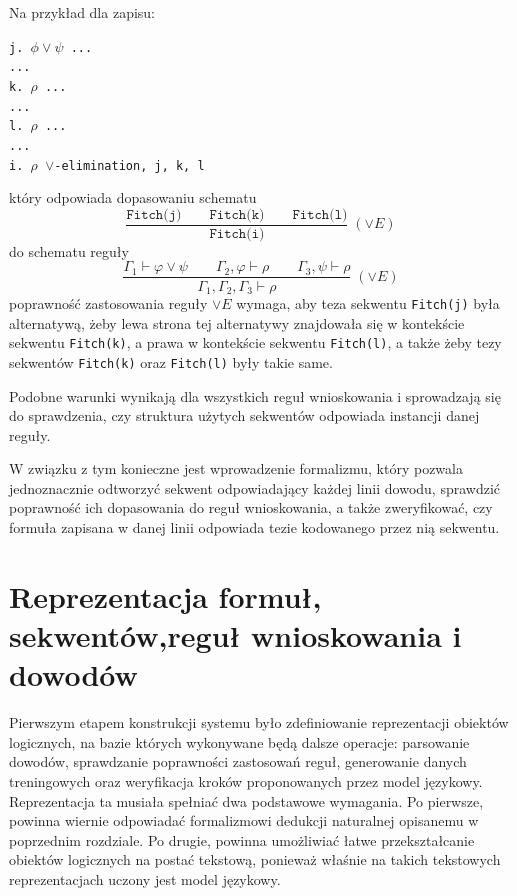 \documentclass[shortabstract]{iithesis}
\theoremstyle{definition}
\theoremstyle{remark}
\theoremstyle{plain}
\begin{document}
Na przykład dla zapisu:
\noindent
\begin{flushleft}
\texttt{j. $\phi \lor \psi$ \quad ... \\
... \\
k. $\rho$ \quad ... \\
... \\
l. $\rho$ \quad ... \\
... \\
i. $\rho$ \quad $\lor$-elimination, j, k, l
}
\end{flushleft}
który odpowiada dopasowaniu schematu
$$
\frac{\texttt{Fitch(j)} \qquad \texttt{Fitch(k)} \qquad \texttt{Fitch(l)}}
     {\texttt{Fitch(i)}}\;(\vee E)
$$
do schematu reguły 
$$
\frac{\Gamma_1 \vdash \varphi \vee \psi \qquad \Gamma_2,\varphi \vdash \rho \qquad \Gamma_3,\psi \vdash \rho}
     {\Gamma_1,\Gamma_2,\Gamma_3 \vdash \rho}\;(\vee E)
$$
poprawność zastosowania reguły $\lor E$ wymaga, aby teza sekwentu \texttt{Fitch(j)} była alternatywą, żeby
lewa strona tej alternatywy znajdowała się w kontekście sekwentu \texttt{Fitch(k)}, a prawa 
w kontekście sekwentu \texttt{Fitch(l)}, a także żeby tezy sekwentów \texttt{Fitch(k)} oraz \texttt{Fitch(l)} były takie same.  



Podobne warunki wynikają dla wszystkich reguł wnioskowania i sprowadzają się
do sprawdzenia, czy struktura użytych sekwentów odpowiada instancji danej reguły.

W związku z tym konieczne jest wprowadzenie formalizmu, który pozwala jednoznacznie
odtworzyć sekwent odpowiadający każdej linii dowodu, sprawdzić poprawność
ich dopasowania do reguł wnioskowania, a także zweryfikować, czy formuła zapisana
w danej linii odpowiada tezie kodowanego przez nią sekwentu.


\chapter{Reprezentacja formuł, sekwentów,reguł wnioskowania i dowodów}

Pierwszym etapem konstrukcji systemu było zdefiniowanie reprezentacji obiektów
logicznych, na bazie których wykonywane będą dalsze operacje: parsowanie dowodów,
sprawdzanie poprawności zastosowań reguł, generowanie danych treningowych oraz
weryfikacja kroków proponowanych przez model językowy. Reprezentacja ta musiała
spełniać dwa podstawowe wymagania. Po pierwsze, powinna wiernie odpowiadać
formalizmowi dedukcji naturalnej opisanemu w poprzednim rozdziale. Po drugie,
powinna umożliwiać łatwe przekształcanie obiektów logicznych na postać tekstową,
ponieważ właśnie na takich tekstowych reprezentacjach uczony jest model językowy.
\end{document}
